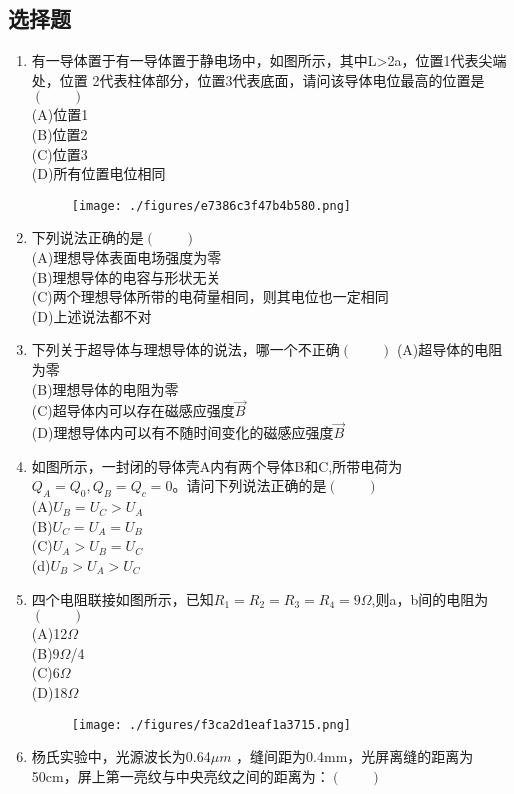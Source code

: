 \subsection{选择题}
\begin{enumerate}
\item 有一导体置于有一导体置于静电场中，如图所示，其中L>2a，位置1代表尖端处，位置 2代表柱体部分，位置3代表底面，请问该导体电位最高的位置是$(\qquad)$\\
(A)位置1\\
(B)位置2\\
(C)位置3\\
(D)所有位置电位相同
\begin{figure}[ht]
\centering
\texttt{[image: ./figures/e7386c3f47b4b580.png]}
\caption{} \label{fig_CD09_2}
\end{figure}
\item 下列说法正确的是$(\qquad)$\\
(A)理想导体表面电场强度为零\\
(B)理想导体的电容与形状无关\\
(C)两个理想导体所带的电荷量相同，则其电位也一定相同\\
(D)上述说法都不对
\item 下列关于超导体与理想导体的说法，哪一个不正确$(\qquad)$
(A)超导体的电阻为零\\
(B)理想导体的电阻为零\\
(C)超导体内可以存在磁感应强度$\vec B$\\
(D)理想导体内可以有不随时间变化的磁感应强度$\vec B$
\item 如图所示，一封闭的导体壳A内有两个导体B和C,所带电荷为$Q_A=Q_0,Q_B=Q_c=0$。请问下列说法正确的是$(\qquad)$\\
(A)$U_B=U_C>U_A$\\
(B)$U_C=U_A=U_B$\\
(C)$U_A>U_B=U_C$\\
(d)$U_B>U_A>U_C$
\item 四个电阻联接如图所示，已知$R_1=R_2=R_3=R_4=9\Omega$,则a，b间的电阻为$(\qquad)$\\
(A)12$\Omega$\\
(B)9$\Omega$/4\\
(C)6$\Omega$\\
(D)18$\Omega$
\begin{figure}[ht]
\centering
\texttt{[image: ./figures/f3ca2d1eaf1a3715.png]}
\caption{} \label{fig_CD09_1}
\end{figure}
\item 杨氏实验中，光源波长为0.64$\mu m$ ，缝间距为0.4mm，光屏离缝的距离为50cm，屏上第一亮纹与中央亮纹之间的距离为：$(\qquad)$\\

\end{enumerate}
